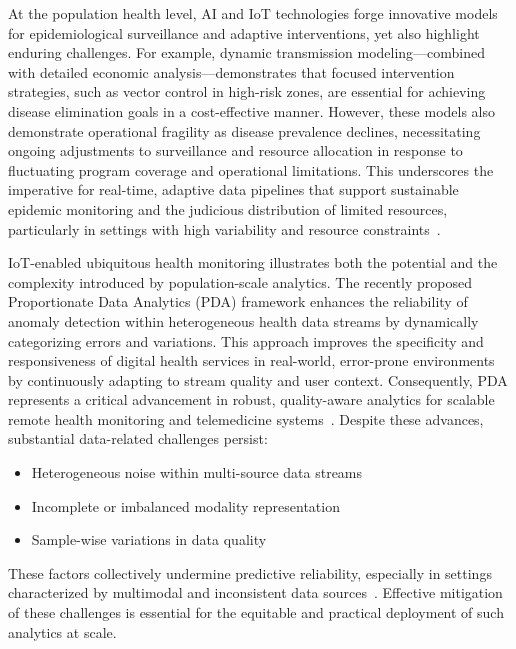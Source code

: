 \documentclass[11pt]{article}
\begin{document}
At the population health level, AI and IoT technologies forge innovative models for epidemiological surveillance and adaptive interventions, yet also highlight enduring challenges. For example, dynamic transmission modeling—combined with detailed economic analysis—demonstrates that focused intervention strategies, such as vector control in high-risk zones, are essential for achieving disease elimination goals in a cost-effective manner. However, these models also demonstrate operational fragility as disease prevalence declines, necessitating ongoing adjustments to surveillance and resource allocation in response to fluctuating program coverage and operational limitations. This underscores the imperative for real-time, adaptive data pipelines that support sustainable epidemic monitoring and the judicious distribution of limited resources, particularly in settings with high variability and resource constraints~\cite{ref61,ref63}.

IoT-enabled ubiquitous health monitoring illustrates both the potential and the complexity introduced by population-scale analytics. The recently proposed Proportionate Data Analytics (PDA) framework enhances the reliability of anomaly detection within heterogeneous health data streams by dynamically categorizing errors and variations. This approach improves the specificity and responsiveness of digital health services in real-world, error-prone environments by continuously adapting to stream quality and user context. Consequently, PDA represents a critical advancement in robust, quality-aware analytics for scalable remote health monitoring and telemedicine systems~\cite{ref79}. Despite these advances, substantial data-related challenges persist:

\begin{itemize}
    \item Heterogeneous noise within multi-source data streams
    \item Incomplete or imbalanced modality representation
    \item Sample-wise variations in data quality
\end{itemize}
These factors collectively undermine predictive reliability, especially in settings characterized by multimodal and inconsistent data sources~\cite{ref78}. Effective mitigation of these challenges is essential for the equitable and practical deployment of such analytics at scale.
\end{document}

